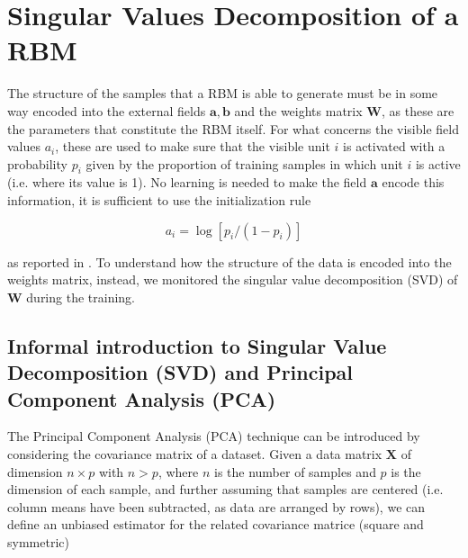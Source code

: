 \documentclass[notitlepage]{revtex4-1}
\begin{document}

\section{Singular Values Decomposition of a RBM}
The structure of the samples that a RBM  is able to generate must be in some way encoded into the external fields \(\mathbf{a},\mathbf{b}\) and the weights matrix \(\mathbf{W}\), as these are the parameters that constitute the RBM itself. For what concerns the visible field values \(a_i\), these are used to make sure that the visible unit \(i\) is activated with a probability \(p_i\) given by the proportion of training samples in which unit \(i\) is active (i.e. where its value is 1). No learning is needed to make the field \(\mathbf{a}\) encode this information, it is sufficient to use the initialization rule

\begin{equation}
a_i = \log[p_i/(1-p_i)]
\label{eq:bias_init}
\end{equation}

as reported in \cite{Hinton_guide}. To understand how the structure of the data is encoded into the weights matrix, instead, we monitored the singular value decomposition (SVD) of \(\mathbf{W}\) during the training.

\subsection{Informal introduction to Singular Value Decomposition (SVD) and Principal Component Analysis (PCA)} \label{sec:svd_pca}

The Principal Component Analysis (PCA) technique can be introduced by considering the covariance matrix of a dataset. Given a data matrix \(\mathbf{X}\) of dimension \(n \times p\) with \(n > p\), where \(n\) is the number of samples and \(p\) is the dimension of each sample, and further assuming that samples are centered (i.e. column means have been subtracted, as data are arranged by rows), we can define an unbiased estimator for the related covariance matrice (square and symmetric)

\end{document}
